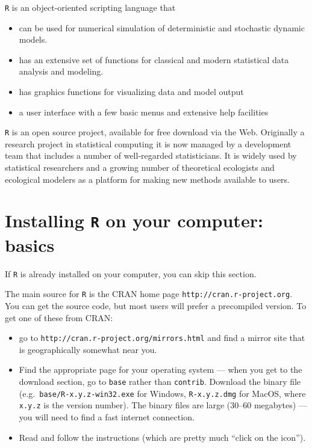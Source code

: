 \documentclass[11pt,]{article}
\begin{document}
\texttt{R} is an object-oriented scripting language that

\begin{itemize}
\item
  can be used for numerical simulation of deterministic and stochastic dynamic models.
\item
  has an extensive set of functions for classical and modern statistical data analysis and modeling.
\item
  has graphics functions for visualizing data and model output
\item
  a user interface with a few basic menus and extensive help facilities
\end{itemize}

\texttt{R} is an open source project, available for free download via the Web. Originally a research project in statistical computing it is now managed by a development team that includes a number of well-regarded statisticians. It is widely used by statistical researchers and a growing number of theoretical ecologists and ecological modelers as a platform for making new methods available to users.

\hypertarget{installing-r-on-your-computer-basics}{%
\section{\texorpdfstring{Installing \texttt{R} on your computer: basics}{Installing R on your computer: basics}}\label{installing-r-on-your-computer-basics}}

If \texttt{R} is already installed on your computer, you can skip this section.

The main source for \texttt{R} is the CRAN home page \texttt{http://cran.r-project.org}.
You can get the source code, but most users will prefer a precompiled
version. To get one of these from CRAN:

\begin{itemize}
\item
  go to \texttt{http://cran.r-project.org/mirrors.html} and find
  a mirror site that is geographically somewhat near you.
\item
  Find the appropriate page for your operating system --- when you get to the
  download section, go to \texttt{base} rather than \texttt{contrib}. Download the binary file (e.g.~\texttt{base/R-x.y.z-win32.exe} for Windows, \texttt{R-x.y.z.dmg} for MacOS, where \texttt{x.y.z} is the version number). The binary files are large (30--60 megabytes) --- you will need to find a fast internet connection.
\item
  Read and follow the instructions (which are pretty much ``click on the icon'').
\end{itemize}
\end{document}

